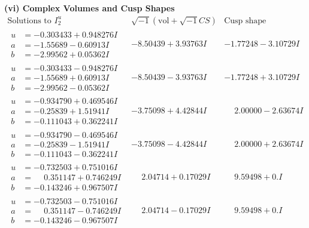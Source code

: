 \documentclass[1p]{elsarticle_modified}
\theoremstyle{definition}
\newcommand{\I}{\sqrt{-1}}
\begin{document}
\newpage\flushleft \textbf{(vi) Complex Volumes and Cusp Shapes}
$$\begin{array}{c|c|c}  
\text{Solutions to }I^u_{2}& \I (\text{vol} + \sqrt{-1}CS) & \text{Cusp shape}\\
 \hline 
\begin{aligned}
u &= -0.303433 + 0.948276 I \\
a &= -1.55689 - 0.60913 I \\
b &= -2.99562 + 0.05362 I\end{aligned}
 & -8.50439 + 3.93763 I & -1.77248 - 3.10729 I \\ \hline\begin{aligned}
u &= -0.303433 - 0.948276 I \\
a &= -1.55689 + 0.60913 I \\
b &= -2.99562 - 0.05362 I\end{aligned}
 & -8.50439 - 3.93763 I & -1.77248 + 3.10729 I \\ \hline\begin{aligned}
u &= -0.934790 + 0.469546 I \\
a &= -0.25839 + 1.51941 I \\
b &= -0.111043 + 0.362241 I\end{aligned}
 & -3.75098 + 4.42844 I & \phantom{-}2.00000 - 2.63674 I \\ \hline\begin{aligned}
u &= -0.934790 - 0.469546 I \\
a &= -0.25839 - 1.51941 I \\
b &= -0.111043 - 0.362241 I\end{aligned}
 & -3.75098 - 4.42844 I & \phantom{-}2.00000 + 2.63674 I \\ \hline\begin{aligned}
u &= -0.732503 + 0.751016 I \\
a &= \phantom{-}0.351147 + 0.746249 I \\
b &= -0.143246 + 0.967507 I\end{aligned}
 & \phantom{-}2.04714 + 0.17029 I & \phantom{-}9.59498 + 0. I\phantom{ +0.000000I} \\ \hline\begin{aligned}
u &= -0.732503 - 0.751016 I \\
a &= \phantom{-}0.351147 - 0.746249 I \\
b &= -0.143246 - 0.967507 I\end{aligned}
 & \phantom{-}2.04714 - 0.17029 I & \phantom{-}9.59498 + 0. I\phantom{ +0.000000I} \\ \hline\begin{aligned}

\end{aligned}
\end{array}$$
\end{document}
